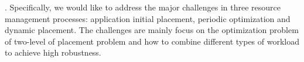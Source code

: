 
. Specifically, we would like to address the major challenges in three resource management processes: application initial placement, periodic optimization and dynamic placement. The challenges are mainly focus on the optimization problem of two-level of placement problem and how to combine different types of workload to achieve high robustness.  
